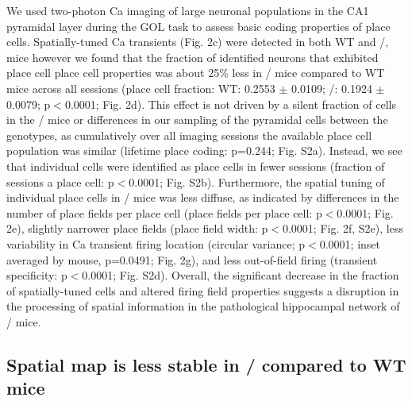 We used two-photon Ca imaging of large neuronal populations in the CA1 pyramidal layer during the GOL task to assess basic coding properties of place cells. Spatially-tuned Ca transients \citep{Dombeck2007} (Fig. 2c) were detected in both WT and \df/, mice however we found that the fraction of identified neurons that exhibited place cell place cell properties was about 25\% less in \df/ mice compared to WT mice across all sessions (place cell fraction: WT: 0.2553 $\pm$ 0.0109; \df/: 0.1924 $\pm$ 0.0079; p$<$0.0001; Fig. 2d).  This effect is not driven by a silent fraction of cells in the \df/ mice or differences in our sampling of the pyramidal cells between the genotypes, as cumulatively over all imaging sessions the available place cell population was similar (lifetime place coding: p=0.244; Fig. S2a). Instead, we see that individual cells were identified as place cells in fewer sessions (fraction of sessions a place cell: p$<$0.0001; Fig. S2b). Furthermore, the spatial tuning of individual place cells in \df/ mice was less diffuse, as indicated by differences in the number of place fields per place cell (place fields per place cell: p$<$0.0001; Fig. 2e), slightly narrower place fields (place field width: p$<$0.0001; Fig. 2f, S2e), less variability in Ca transient firing location (circular variance; p$<$0.0001; inset averaged by mouse, p=0.0491; Fig. 2g), and less out-of-field firing (transient specificity: p$<$0.0001; Fig. S2d).  Overall, the significant decrease in the fraction of spatially-tuned cells and altered firing field properties suggests a disruption in the processing of spatial information in the pathological hippocampal network of \df/ mice.

\subsection{Spatial map is less stable in \df/ compared to WT mice}

